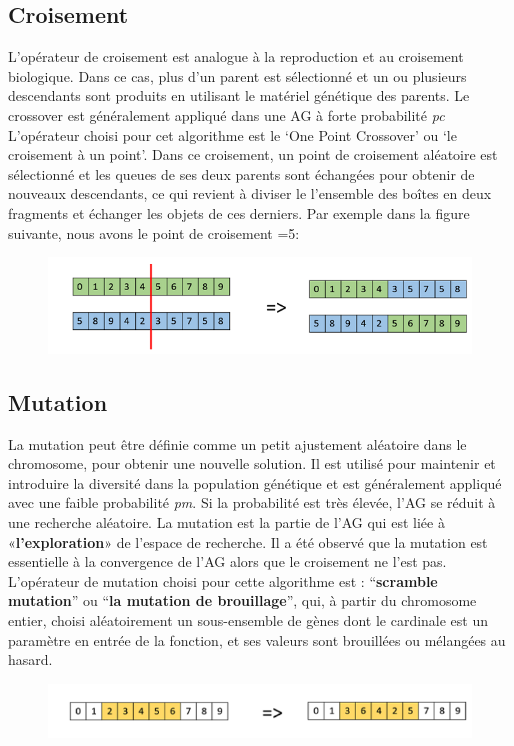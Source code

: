 \documentclass{article}
\begin{document}
\subsection{Croisement}
L'opérateur de croisement est analogue à la reproduction et au croisement biologique. Dans ce cas, plus d'un parent est sélectionné et un ou plusieurs descendants sont produits en utilisant le matériel génétique des parents. Le crossover est généralement appliqué dans une AG à forte probabilité \textit{pc}
\newline
L’opérateur choisi pour cet algorithme est le ‘One Point Crossover’ ou ‘le croisement à un point’. Dans ce croisement, un point de croisement aléatoire est sélectionné et les queues de ses deux parents sont échangées pour obtenir de nouveaux descendants, ce qui revient à diviser le l’ensemble des boîtes en deux fragments et échanger les objets de ces derniers.
\newline
Par exemple dans la figure suivante, nous avons le point de croisement =5:
\begin{figure}[H]
  \includegraphics[width=\linewidth]{../figures/pic05.PNG}
\end{figure}
\subsection{Mutation}
La mutation peut être définie comme un petit ajustement aléatoire dans le chromosome, pour obtenir une nouvelle solution. Il est utilisé pour maintenir et introduire la diversité dans la population génétique et est généralement appliqué avec une faible probabilité \textit{pm}. Si la probabilité est très élevée, l'AG se réduit à une recherche aléatoire.
\newline
La mutation est la partie de l'AG qui est liée à «\textbf{l'exploration}» de l'espace de recherche. Il a été observé que la mutation est essentielle à la convergence de l'AG alors que le croisement ne l'est pas.
\newline
L’opérateur de mutation choisi pour cette algorithme est :  “\textbf{scramble mutation}” ou “\textbf{la mutation de brouillage}”, qui, à partir du chromosome entier, choisi aléatoirement un sous-ensemble de gènes dont le cardinale est un paramètre en entrée de la fonction, et ses valeurs sont brouillées ou mélangées au hasard.
\begin{figure}[H]
  \includegraphics[width=\linewidth]{../figures/pic06.PNG}
\end{figure}
\end{document}
